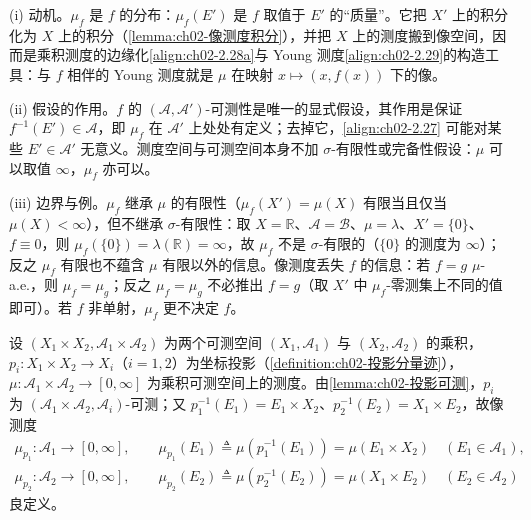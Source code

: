 \documentclass[../../main.tex]{subfiles}%
\begin{document}
\begin{remark}\label{remark:ch02-像测度动机}
(i) 动机。$\mu_f$ 是 $f$ 的分布：$\mu_f(E')$ 是 $f$ 取值于 $E'$ 的“质量”。它把 $X'$ 上的积分化为 $X$ 上的积分（\cref{lemma:ch02-像测度积分}），并把 $X$ 上的测度搬到像空间，因而是乘积测度的边缘化\eqref{align:ch02-2.28a}与 Young 测度\eqref{align:ch02-2.29}的构造工具：与 $f$ 相伴的 Young 测度就是 $\mu$ 在映射 $x\mapsto(x,f(x))$ 下的像。

(ii) 假设的作用。$f$ 的 $(\mathscr A,\mathscr A')$-可测性是唯一的显式假设，其作用是保证 $f^{-1}(E')\in\mathscr A$，即 $\mu_f$ 在 $\mathscr A'$ 上处处有定义；去掉它，\eqref{align:ch02-2.27} 可能对某些 $E'\in\mathscr A'$ 无意义。测度空间与可测空间本身不加 $\sigma$-有限性或完备性假设：$\mu$ 可以取值 $\infty$，$\mu_f$ 亦可以。

(iii) 边界与例。$\mu_f$ 继承 $\mu$ 的有限性（$\mu_f(X')=\mu(X)$ 有限当且仅当 $\mu(X)<\infty$），但不继承 $\sigma$-有限性：取 $X=\mathbb R$、$\mathscr A=\mathscr B$、$\mu=\lambda$、$X'=\{0\}$、$f\equiv0$，则 $\mu_f(\{0\})=\lambda(\mathbb R)=\infty$，故 $\mu_f$ 不是 $\sigma$-有限的（$\{0\}$ 的测度为 $\infty$）；反之 $\mu_f$ 有限也不蕴含 $\mu$ 有限以外的信息。像测度丢失 $f$ 的信息：若 $f=g$ $\mu$-a.e.，则 $\mu_f=\mu_g$；反之 $\mu_f=\mu_g$ 不必推出 $f=g$（取 $X'$ 中 $\mu_f$-零测集上不同的值即可）。若 $f$ 非单射，$\mu_f$ 更不决定 $f$。
\end{remark}

设 $(X_1\times X_2,\mathscr A_1\times\mathscr A_2)$ 为两个可测空间 $(X_1,\mathscr A_1)$ 与 $(X_2,\mathscr A_2)$ 的乘积，$p_i:X_1\times X_2\to X_i$（$i=1,2$）为坐标投影（\cref{definition:ch02-投影分量迹}），$\mu:\mathscr A_1\times\mathscr A_2\to[0,\infty]$ 为乘积可测空间上的测度。由\cref{lemma:ch02-投影可测}，$p_i$ 为 $(\mathscr A_1\times\mathscr A_2,\mathscr A_i)$-可测；又 $p_1^{-1}(E_1)=E_1\times X_2$、$p_2^{-1}(E_2)=X_1\times E_2$，故像测度
\begin{align}
\mu_{p_1}:\mathscr A_1\to[0,\infty],\qquad \mu_{p_1}(E_1)\triangleq \mu(p_1^{-1}(E_1))=\mu(E_1\times X_2)\quad(E_1\in\mathscr A_1), \label{align:ch02-2.28a}\\
\mu_{p_2}:\mathscr A_2\to[0,\infty],\qquad \mu_{p_2}(E_2)\triangleq \mu(p_2^{-1}(E_2))=\mu(X_1\times E_2)\quad(E_2\in\mathscr A_2) \label{align:ch02-2.28b}
\end{align}
良定义。
\end{document}
